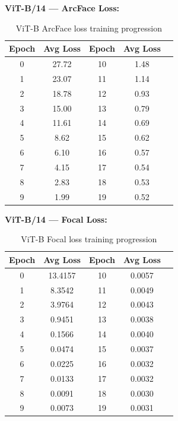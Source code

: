 \documentclass[
    english,
]{VUMIFPSbakalaurinis}
\begin{document}
\textbf{ViT-B/14 — ArcFace Loss:}
\begin{table}[H]
\centering
\small
\begin{tabular}{ccccc}
\toprule
\textbf{Epoch} & \textbf{Avg Loss} & \textbf{Epoch} & \textbf{Avg Loss} \\
\midrule
0 & 27.72 & 10 & 1.48 \\
1 & 23.07 & 11 & 1.14 \\
2 & 18.78 & 12 & 0.93 \\
3 & 15.00 & 13 & 0.79 \\
4 & 11.61 & 14 & 0.69 \\
5 & 8.62  & 15 & 0.62 \\
6 & 6.10  & 16 & 0.57 \\
7 & 4.15  & 17 & 0.54 \\
8 & 2.83  & 18 & 0.53 \\
9 & 1.99  & 19 & 0.52 \\
\bottomrule
\end{tabular}
\caption{ViT-B ArcFace loss training progression}
\end{table}

\textbf{ViT-B/14 — Focal Loss:}
\begin{table}[H]
\centering
\small
\begin{tabular}{ccccc}
\toprule
\textbf{Epoch} & \textbf{Avg Loss} & \textbf{Epoch} & \textbf{Avg Loss} \\
\midrule
0 & 13.4157 & 10 & 0.0057 \\
1 & 8.3542  & 11 & 0.0049 \\
2 & 3.9764  & 12 & 0.0043 \\
3 & 0.9451  & 13 & 0.0038 \\
4 & 0.1566  & 14 & 0.0040 \\
5 & 0.0474  & 15 & 0.0037 \\
6 & 0.0225  & 16 & 0.0032 \\
7 & 0.0133  & 17 & 0.0032 \\
8 & 0.0091  & 18 & 0.0030 \\
9 & 0.0073  & 19 & 0.0031 \\
\bottomrule
\end{tabular}
\caption{ViT-B Focal loss training progression}
\end{table}
\end{document}
